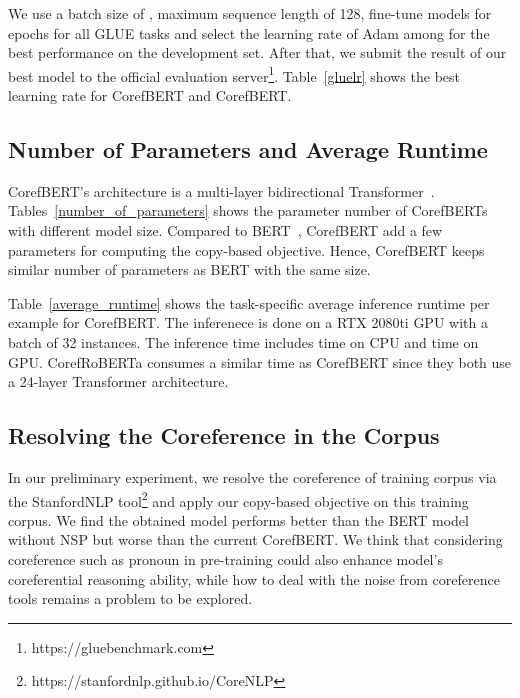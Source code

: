 \documentclass[11pt,a4paper]{article}
\newcommand\CorefBERT{CorefBERT\xspace}
\newcommand\BASESIZE{\xspace}
\newcommand\LARGESIZE{\xspace}
\begin{document}
We use a batch size of , maximum sequence length of 128,  fine-tune models for  epochs for all GLUE tasks and select the learning rate of Adam among  for the best performance on the development set. After that, we submit the result of our best model to the official evaluation server\footnote{https://gluebenchmark.com}. Table~\ref{gluelr} shows the best learning rate  for CorefBERT\BASESIZE and CorefBERT\LARGESIZE.





\subsection{Number of Parameters and Average Runtime}

CorefBERT's architecture is a multi-layer bidirectional Transformer~\citep{Transformer}. Tables~\ref{number_of_parameters} shows the  parameter number of CorefBERTs with different model size. Compared to BERT~\citep{BERT}, \CorefBERT add a few parameters for computing the copy-based objective. Hence, \CorefBERT keeps similar number of parameters as BERT with the same size.


Table~\ref{average_runtime} shows the task-specific average inference runtime per example for CorefBERT. The inferenece is done on a RTX 2080ti GPU with a batch of 32 instances. The inference time includes time on CPU and time on GPU. CorefRoBERTa\LARGESIZE consumes a similar time as CorefBERT\LARGESIZE since they both use a 24-layer Transformer architecture.


\subsection{Resolving the Coreference in the Corpus}
In our preliminary experiment, we resolve the coreference of training corpus via the StanfordNLP tool\footnote{{https://stanfordnlp.github.io/CoreNLP}} and apply our copy-based objective on this training corpus. We find the obtained model performs better than the BERT model without NSP but worse than the current CorefBERT. We think that considering coreference such as pronoun in pre-training could also enhance model's coreferential reasoning ability, while how to deal with the noise from coreference tools remains a problem to be explored.
\end{document}
